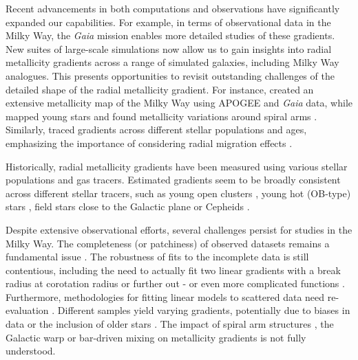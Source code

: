\documentclass[twocolumn,apj,numberedappendix,appendixfloats,twocolappendix]{openjournal}
\begin{document}
\begin{CJK*}{UTF8}{gbsn}
Recent advancements in both computations and observations have significantly expanded our capabilities. For example, in terms of observational data in the Milky Way, the \textit{Gaia} mission \citep{Gaia-Collaboration2016} enables more detailed studies of these gradients. New suites of large-scale simulations now allow us to gain insights into radial metallicity gradients across a range of simulated galaxies, including Milky Way analogues. This presents opportunities to revisit outstanding challenges of the detailed shape of the radial metallicity gradient. For instance, \citet{Hogg2019} created an extensive metallicity map of the Milky Way using APOGEE and \textit{Gaia} data, while \citet{Poggio2022} mapped young stars and found metallicity variations around spiral arms \citep[see also][]{Zari2018, Zari2021, Poggio2021, Hackshaw2024}. Similarly, \citet[][among others]{Imig2023} traced gradients across different stellar populations and ages, emphasizing the importance of considering radial migration effects \citep{Binney2008, Frankel2018, Frankel2020}.

Historically, radial metallicity gradients have been measured using various stellar populations and gas tracers. Estimated gradients seem to be broadly consistent across different stellar tracers, such as young open clusters \citep[e.g.][]{Yong2012, Cunha2016, Magrini2017, Casamiquela2019, Donor2020, Spina2021,Myers2022}, young hot (OB-type) stars \citep{Zari2018, Zari2021, Poggio2021, Poggio2022}, field stars close to the Galactic plane \citep[e.g.][]{Bergemann2014} or Cepheids \citep{Andrievsky2002, Andrievsky2002b, Lemasle2007, Lemasle2013}.

Despite extensive observational efforts, several challenges persist for studies in the Milky Way. The completeness (or patchiness) of observed datasets remains a fundamental issue \citep{Bergemann2014}. The robustness of fits to the incomplete data is still contentious, including the need to actually fit two linear gradients with a break radius at corotation radius \citep[][and references therein]{Bresolin2012} or further out \citep{Yong2012, Donor2020} - or even more complicated functions \citep[see e.g.][]{Chiappini2001, Kubryk2015}. Furthermore, methodologies for fitting linear models to scattered data need re-evaluation \citep{Metha2021}. Different samples yield varying gradients, potentially due to biases in data or the inclusion of older stars \citep[e.g.][]{AllendePrieto2006, Hayden2014, Anders2014, Vickers2021, Willett2023}. The impact of spiral arm structures \citep{Poggio2021}, the Galactic warp \citep{Lemasle2022} or bar-driven mixing \citep{DiMatteo2013} on metallicity gradients is not fully understood.


\end{CJK*}
\end{document}
